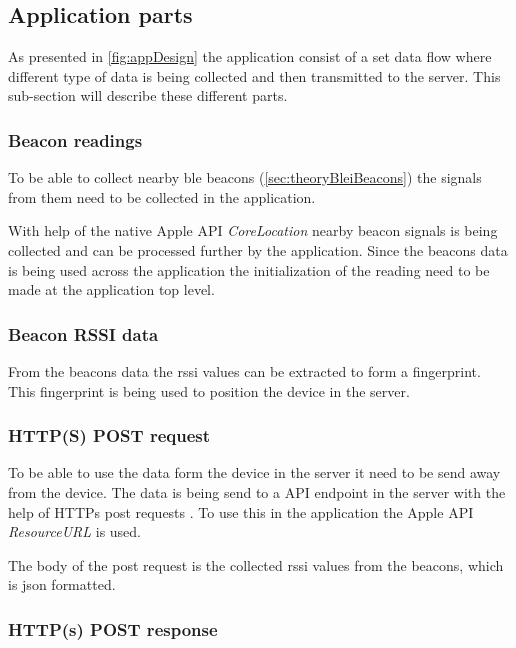 \subsection{Application parts}\label{sec:implAppParts}
As presented in \cref{fig:appDesign} the application consist of a set data flow where different type of data is being collected and then transmitted to the server.
This sub-section will describe these different parts.

\subsubsection{Beacon readings}\label{sec:implAppPartsBeacons}
To be able to collect nearby \acrshort{ble} beacons (\cref{sec:theoryBleiBeacons}) the signals from them need to be collected in the application.

\bigskip

With help of the native Apple API \textit{CoreLocation} \cite{...} nearby beacon signals is being collected and can be processed further by the application.
Since the beacons data is being used across the application the initialization of the reading need to be made at the application top level.

\subsubsection{Beacon RSSI data}\label{sec:implAppPartsRssi}
From the beacons data the \acrshort{rssi} values can be extracted to form a fingerprint.
This fingerprint is being used to position the device in the server.

\subsubsection{HTTP(S) POST request}\label{sec:implAppPartsPostReq}
To be able to use the data form the device in the server it need to be send away from the device.
The data is being send to a API endpoint in the server with the help of HTTPs post requests \cite{...}.
To use this in the application the Apple API \textit{ResourceURL} \cite{...} is used.

\bigskip

The body of the post request is the collected \acrshort{rssi} values from the beacons, which is \acrfull{json} \cite{IntroducingJSON} formatted.

\subsubsection{HTTP(s) POST response}\label{sec:implAppPartsPostRes}



